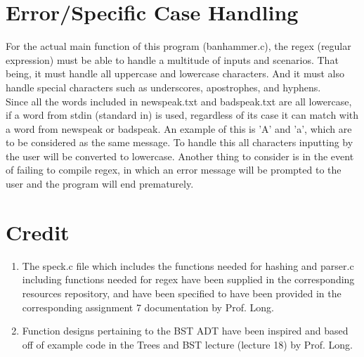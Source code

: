 \documentclass[
	12pt, %
]{fphw}
\begin{document}

\section{Error/Specific Case Handling}
For the actual main function of this program (banhammer.c), the regex (regular expression) must be able to handle a multitude of inputs and scenarios. That being, it must handle all uppercase and lowercase characters. And it must also handle special characters such as underscores, apostrophes, and hyphens. \\
Since all the words included in newspeak.txt and badspeak.txt are all lowercase, if a word from stdin (standard in) is used, regardless of its case it can match with a word from newspeak or badspeak. An example of this is 'A' and 'a', which are to be considered as the same message. To handle this all characters inputting by the user will be converted to lowercase. Another thing to consider is in the event of failing to compile regex, in which an error message will be prompted to the user and the program will end prematurely.

\section{Credit}

\begin{enumerate}
	\item The speck.c file which includes the functions needed for hashing and parser.c including functions needed for regex have been supplied in the corresponding resources repository, and have been specified to have been provided in the corresponding assignment 7 documentation by Prof. Long.
	\item Function designs pertaining to the BST ADT have been inspired and based off of example code in the Trees and BST lecture (lecture 18) by Prof. Long.
\end{enumerate}


\end{document}
